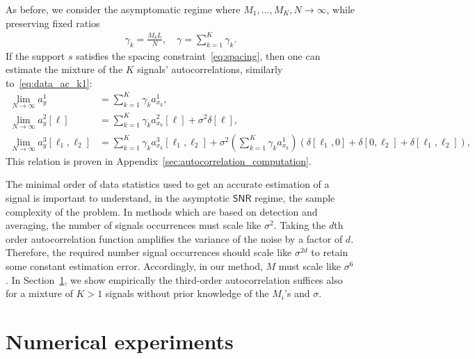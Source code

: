 \documentclass[english,11pt]{article}
\newcommand{\TODO}[1]{{\color{red}{[#1]}}}
\numberwithin{equation}{section}
\theoremstyle{plain}
\theoremstyle{definition}
\theoremstyle{remark}
\theoremstyle{plain}
\theoremstyle{remark}
\theoremstyle{plain}
\theoremstyle{plain}
\newcommand{\SNR}{{\textsf{SNR}}}
\begin{document}
As before, we consider  the asymptomatic regime where $M_1,\ldots,M_K,N\to\infty$, while preserving fixed ratios
\begin{align}
	\gamma_k = \frac{M_k L}{N}, \quad \gamma = \sum_{k=1}^K\gamma_k.
\end{align}
If the support $s$ satisfies the spacing constraint~\eqref{eq:spacing}, then one can estimate the mixture of the $K$ signals'  autocorrelations, similarly to~\eqref{eq:data_ac_k1}: 
\begin{align}
\lim_{N\to\infty} a_y^1 & = \sum_{k=1}^K\gamma_k a_{x_k}^1, \nonumber\\
\lim_{N\to\infty} a_y^2[\ell] & = \sum_{k=1}^K\gamma_k a_{x_k}^2[\ell] +\sigma^2\delta[\ell],  \label{eq:data_ac}\\
\lim_{N\to\infty} a_y^3[\ell_1,\ell_2] & = \sum_{k=1}^K\gamma_k a_{x_k}^3[\ell_1,\ell_2] + \sigma^2\left(\sum_{k=1}^K\gamma_k a_{x_k}^1\right)(\delta[\ell_1,0]+\delta[0,\ell_2]+\delta[\ell_1,\ell_2]), \nonumber
\end{align}
This relation is proven in  Appendix~\ref{sec:autocorrelation_computation}.

The minimal order of data statistics used to get an accurate estimation of a signal is important to understand, in the asymptotic $\SNR$ regime, the sample complexity of the problem.
In methods which are based on detection and averaging, the number of signals occurrences  must scale like $\sigma^2$. Taking the $d$th order autocorrelation function amplifies the variance of the noise by a factor of $d$. Therefore, the required number signal occurrences should scale like $\sigma^{2d}$  to retain some constant estimation error. Accordingly, in our  method, $M$ must scale like $\sigma^6$. In Section~\ref{sec:numerics}, we show empirically the third-order autocorrelation suffices also for a mixture of $K>1$ signals without prior knowledge of the $M_i$'s and $\sigma$.  \TODO{question mark on the entire paragraph}
\TODO{NB: We could move here the paragraphs from 1D XP about which moments we compute, to argue that we can expect to recover at most up to $K = L/2$ signals.} \TODO{TB: I didn't touch for now.}


\section{Numerical experiments}   \label{sec:numerics}

\end{document}
